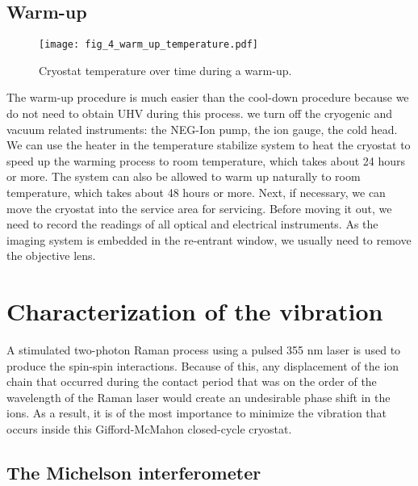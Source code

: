 \subsection{Warm-up}

\begin{figure}
    \centering
    \texttt{[image: fig\_4\_warm\_up\_temperature.pdf]}
    \caption{Cryostat temperature over time during a warm-up.}
\end{figure}

The warm-up procedure is much easier than the cool-down procedure because we do not need to obtain UHV during this process. we turn off the cryogenic and vacuum related instruments: the NEG-Ion pump, the ion gauge, the cold head. We can use the heater in the temperature stabilize system to heat the cryostat to speed up the warming process to room temperature, which takes about 24 hours or more. The system can also be allowed to warm up naturally to room temperature, which takes about 48 hours or more. Next, if necessary, we can move the cryostat into the service area for servicing. Before moving it out, we need to record the readings of all optical and electrical instruments. As the imaging system is embedded in the re-entrant window, we usually need to remove the objective lens.

\section{Characterization of the vibration}

A stimulated two-photon Raman process using a pulsed 355 nm laser is used to produce the spin-spin interactions. Because of this, any displacement of the ion chain that occurred during the contact period that was on the order of the wavelength of the Raman laser would create an undesirable phase shift in the ions. As a result, it is of the most importance to minimize the vibration that occurs inside this Gifford-McMahon closed-cycle cryostat.

\subsection{The Michelson interferometer}

